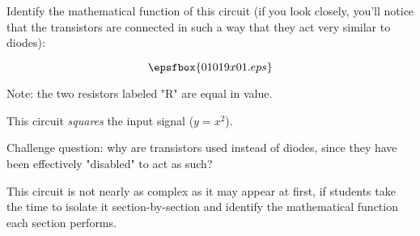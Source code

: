 

Identify the mathematical function of this circuit (if you look closely, you'll notice that the transistors are connected in such a way that they act very similar to diodes):

$$\epsfbox{01019x01.eps}$$

Note: the two resistors labeled "R" are equal in value.







This circuit {\it squares} the input signal ($y = x^2$).

\vskip 10pt

Challenge question: why are transistors used instead of diodes, since they have been effectively "disabled" to act as such?







This circuit is not nearly as complex as it may appear at first, if students take the time to isolate it section-by-section and identify the mathematical function each section performs.





